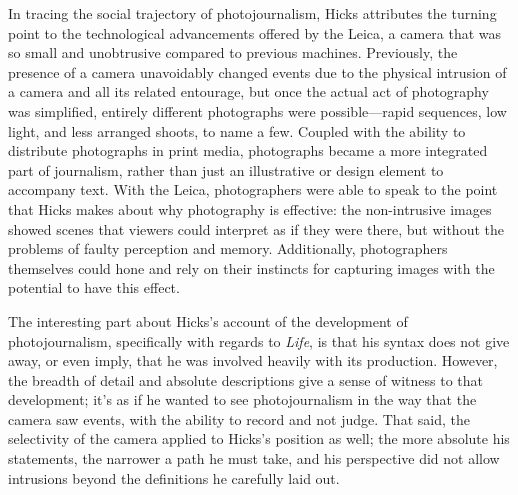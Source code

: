 In tracing the social trajectory of photojournalism, Hicks attributes the
turning point to the technological advancements offered by the Leica, a camera
that was so small and unobtrusive compared to previous machines. Previously, the
presence of a camera unavoidably changed events due to the physical intrusion of
a camera and all its related entourage, but once the actual act of photography
was simplified, entirely different photographs were possible---rapid sequences,
low light, and less arranged shoots, to name a few. Coupled with the ability to
distribute photographs in print media, photographs became a more integrated part
of journalism, rather than just an illustrative or design element to accompany
text. With the Leica, photographers were able to speak to the point that Hicks
makes about why photography is effective: the non-intrusive images showed scenes
that viewers could interpret as if they were there, but without the problems of
faulty perception and memory. Additionally, photographers themselves could hone
and rely on their instincts for capturing images with the potential to have this
effect.

The interesting part about Hicks's account of the development of
photojournalism, specifically with regards to \textit{Life}, is that his syntax
does not give away, or even imply, that he was involved heavily with its
production. However, the breadth of detail and absolute descriptions give a
sense of witness to that development; it's as if he wanted to see
photojournalism in the way that the camera saw events, with the ability to
record and not judge. That said, the selectivity of the camera applied to
Hicks's position as well; the more absolute his statements, the narrower a path
he must take, and his perspective did not allow intrusions beyond the
definitions he carefully laid out.
